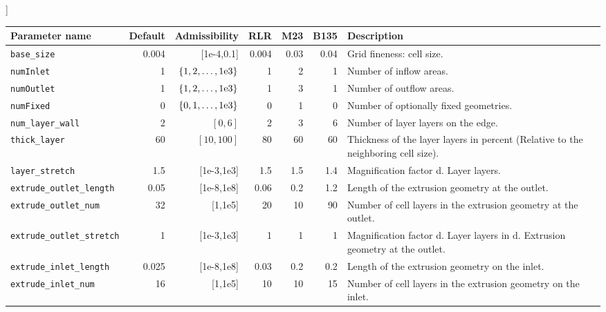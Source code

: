 \documentclass[a4paper,oneside]{book}
\numberwithin{equation}{section}
\begin{document}
\begin{table}[!htbp]]
    \begin{tabular}{|l|r|r|r|r|r|p{5cm}|}
        \hline 
        \cellcolor{light-gray}\textbf{Parameter name} & \cellcolor{light-gray}\textbf{Default} & \cellcolor{light-gray}\textbf{Admissibility} & \cellcolor{light-gray}\textbf{RLR} & \cellcolor{light-gray}\textbf{M23} & \cellcolor{light-gray}\textbf{B135} & \cellcolor{light-gray}\textbf{Description} \\ 
        \hline 
        \verb|base_size| & 0.004 & [1e-4,0.1] & 0.004 & 0.03 & 0.04 & Grid fineness: cell size. \\ 
        \hline 
        \texttt{numInlet} & 1 & $\rm\left\{1,2,\ldots,1e3\right\}$ & 1 & 2 & 1 & Number of inflow areas. \\ 
        \hline 
        \texttt{numOutlet} & 1 & $\rm\left\{1,2,\ldots,1e3\right\}$ & 1 & 3 & 1 & Number of outflow areas. \\ 
        \hline 
        \texttt{numFixed} & 0 & $\rm\left\{0,1,\ldots,1e3\right\}$ & 0 & 1 & 0 & Number of optionally fixed geometries. \\ 
        \hline 
        \verb|num_layer_wall| & 2 & $\left[0,6\right]$ & 2 & 3 & 6 & Number of layer layers on the edge. \\ 
        \hline 
        \verb|thick_layer| & 60 & $\left[10,100\right]$ & 80 & 60 & 60 & Thickness of the layer layers in percent (Relative to the neighboring cell size). \\ 
        \hline 
        \verb|layer_stretch| & 1.5 & [1e-3,1e3] & 1.5 & 1.5 & 1.4 & Magnification factor d. Layer layers. \\ 
        \hline 
        \verb|extrude_outlet_length| & 0.05 & [1e-8,1e8] & 0.06 & 0.2 & 1.2 & Length of the extrusion geometry at the outlet. \\ 
        \hline 
        \verb|extrude_outlet_num| & 32 & [1,1e5] & 20 & 10 & 90 & Number of cell layers in the extrusion geometry
        at the outlet. \\ 
        \hline 
        \verb|extrude_outlet_stretch| & 1 & [1e-3,1e3] & 1 & 1 & 1 & Magnification factor d. Layer layers in d. Extrusion geometry at the outlet. \\ 
        \hline 
        \verb|extrude_inlet_length| & 0.025 & [1e-8,1e8] & 0.03 & 0.2 & 0.2 & Length of the extrusion geometry on the inlet. \\ 
        \hline 
        \verb|extrude_inlet_num| & 16 & [1,1e5] & 10 & 10 & 15 & Number of cell layers in the extrusion geometry on the inlet. \\ 

\end{tabular}
\end{table}
\end{document}
